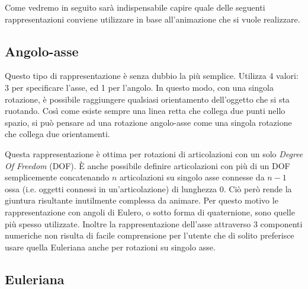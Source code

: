 Come vedremo in seguito sarà indispensabile capire quale delle seguenti rappresentazioni conviene utilizzare in base all'animazione che si vuole realizzare.


\subsection{Angolo-asse}
Questo tipo di rappresentazione è senza dubbio la più semplice.
Utilizza 4 valori: 3 per specificare l'asse, ed 1 per l'angolo.
In questo modo, con una singola rotazione, è possibile raggiungere qualsiasi orientamento dell'oggetto che si sta ruotando.
Così come esiste sempre una linea retta che collega due punti nello spazio, si può pensare ad una rotazione angolo-asse come una singola rotazione che collega due orientamenti.

Questa rappresentazione è ottima per rotazioni di articolazioni con un solo \emph{Degree Of Freedom} (DOF).
È anche possibile definire articolazioni con più di un DOF semplicemente concatenando $n$ articolazioni su singolo asse connesse da $n-1$ ossa (i.e. oggetti connessi in un'articolazione) di lunghezza 0.
Ciò però rende la giuntura risultante inutilmente complessa da animare.
Per questo motivo le rappresentazione con angoli di Eulero, o sotto forma di quaternione, sono quelle più spesso utilizzate.
Inoltre la rappresentazione dell'asse attraverso 3 componenti numeriche non risulta di facile comprensione per l'utente che di solito preferisce usare quella Euleriana anche per rotazioni su singolo asse.

\subsection{Euleriana}

